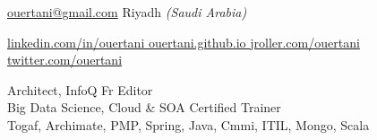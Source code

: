 \documentclass[10pt,a4paper]{article}
\begin{document}
\sloppy  %



\thispagestyle{empty} %

\nobreakvspace{0.3em}  %

\href{mailto:ouertani.at.gmail.dot.com}{ouertani\mbox{}@\mbox{}gmail.com}\sbull
{} \sbull
{ Riyadh} \emph{(Saudi Arabia)}

\href{http://linkedin.com/in/ouertani }{linkedin.com/in/ouertani }\sbull
\href{http://ouertani.github.io }{ouertani.github.io }\sbull
\href{http://jroller.com/ouertani }{jroller.com/ouertani }\sbull
\href{http://twitter.com/ouertani }{twitter.com/ouertani }


\begin{center}
      \Large Architect, InfoQ Fr Editor \\ Big Data Science, Cloud \& SOA  Certified Trainer \\
      \large Togaf, Archimate, PMP, Spring, Java, Cmmi, ITIL, Mongo, Scala
 \end{center}


\spacedhrule{0.9em}{-0.4em}  %

\end{document}
